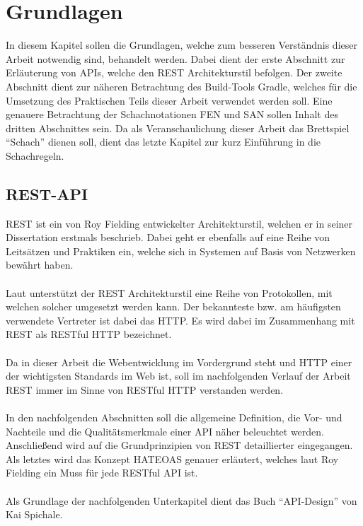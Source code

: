 
\chapter{Grundlagen}
In diesem Kapitel sollen die Grundlagen, welche zum besseren Verständnis dieser Arbeit notwendig sind, behandelt werden. Dabei dient der erste Abschnitt zur Erläuterung von \glspl{API}, welche den \gls{REST} Architekturstil befolgen. Der zweite Abschnitt dient zur näheren Betrachtung des Build-Tools Gradle, welches für die Umsetzung des Praktischen Teils dieser Arbeit verwendet werden soll. Eine genauere Betrachtung der Schachnotationen \gls{FEN} und \gls{SAN} sollen Inhalt des dritten Abschnittes sein. Da als Veranschaulichung dieser Arbeit das Brettspiel \enquote{Schach} dienen soll, dient das letzte Kapitel zur kurz Einführung in die Schachregeln.

\section{REST-API}
\gls{REST} ist ein von Roy Fielding entwickelter Architekturstil, welchen er in seiner Dissertation \cite{dissertationFielding} erstmals beschrieb. Dabei geht er ebenfalls auf eine Reihe von Leitsätzen und Praktiken ein, welche sich in Systemen auf Basis von Netzwerken bewährt haben.\\
\\
Laut \cite[143]{apiDesign} unterstützt der \gls{REST} Architekturstil eine Reihe von Protokollen, mit welchen solcher umgesetzt werden kann. Der bekannteste bzw. am häufigsten verwendete Vertreter ist dabei das \gls{HTTP}. Es wird dabei im Zusammenhang mit \gls{REST} als \gls{REST}ful \gls{HTTP} bezeichnet. \\
\\
Da in dieser Arbeit die Webentwicklung im Vordergrund steht und \gls{HTTP} einer der wichtigsten Standards im Web ist, soll im nachfolgenden Verlauf der Arbeit \gls{REST} immer im Sinne von RESTful \gls{HTTP} verstanden werden.\\
\\
In den nachfolgenden Abschnitten soll die allgemeine Definition, die Vor- und Nachteile und die Qualitätsmerkmale einer \gls{API} näher beleuchtet werden. Anschließend wird auf die Grundprinzipien von \gls{REST} detaillierter eingegangen. Als letztes wird das Konzept HATEOAS genauer erläutert, welches laut Roy Fielding ein Muss \cite{restMustBeHypertextDriven} für jede RESTful \gls{API} ist.\\
\\
Als Grundlage der nachfolgenden Unterkapitel dient das Buch \enquote{API-Design} \cite[7-10, 13-14, 144-148, 189]{apiDesign} von Kai Spichale.

